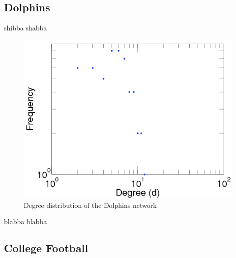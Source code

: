 \subsection{Dolphins}
shibba shabba
\cite{Lusseau2003}
\begin{figure}[!htb]
	\begin{center}
		\includegraphics[scale=.5]{images/dolphins_degree_dist.png}
	\end{center}
	\caption{Degree distribution of the Dolphins network\cite{Kunegis2013}}
	\label{logo}
\end{figure}

blabba blabba

\subsection{College Football}

